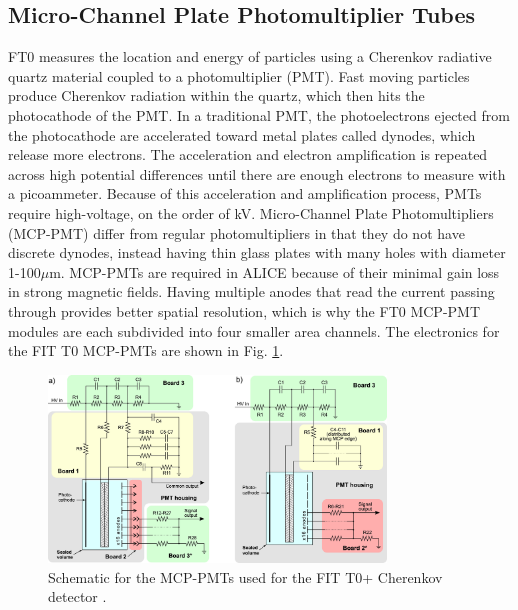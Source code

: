 \subsection{Micro-Channel Plate Photomultiplier Tubes}
FT0 measures the location and energy of particles using a Cherenkov radiative quartz material coupled to a photomultiplier (PMT). Fast moving particles produce Cherenkov radiation within the quartz, which then hits the photocathode of the PMT. In a traditional PMT, the  photoelectrons ejected from the photocathode are accelerated toward metal plates called dynodes, which release more electrons. The acceleration and electron amplification is repeated across high potential differences until there are enough electrons to measure with a picoammeter. Because of this acceleration and amplification process, PMTs require high-voltage, on the order of kV. Micro-Channel Plate Photomultipliers (MCP-PMT) differ from regular photomultipliers in that they do not have discrete dynodes, instead having thin glass plates with many holes with diameter 1-100$\mu$m. MCP-PMTs are required in ALICE because of their minimal gain loss in strong magnetic fields. Having multiple anodes that read the current passing through provides better spatial resolution, which is why the FT0 MCP-PMT modules are each subdivided into four smaller area channels.  The electronics for the FIT T0 MCP-PMTs are shown in Fig. \ref{fig:MCP_PMT_Schematic}.
\begin{figure}[H]
    \centering
    \includegraphics[width=0.8\textwidth]{figures/FIT/PMT_Schematic.jpg} 
    \caption{Schematic for the MCP-PMTs used for the FIT T0+ Cherenkov detector \cite{Yury_MCP-PMT}.}
    \label{fig:MCP_PMT_Schematic}
\end{figure}



